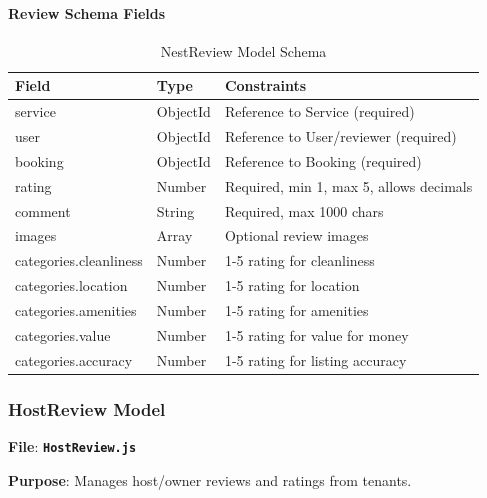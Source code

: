 \documentclass[12pt,a4paper]{article}
\newcommand{\file}[1]{\textbf{\texttt{#1}}}
\begin{document}
\paragraph{Review Schema Fields}
\begin{table}[H]
\centering
\small
\begin{tabular}{@{}lll@{}}
\toprule
\textbf{Field} & \textbf{Type} & \textbf{Constraints} \\
\midrule
service & ObjectId & Reference to Service (required) \\
user & ObjectId & Reference to User/reviewer (required) \\
booking & ObjectId & Reference to Booking (required) \\
rating & Number & Required, min 1, max 5, allows decimals \\
comment & String & Required, max 1000 chars \\
images & Array & Optional review images \\
categories.cleanliness & Number & 1-5 rating for cleanliness \\
categories.location & Number & 1-5 rating for location \\
categories.amenities & Number & 1-5 rating for amenities \\
categories.value & Number & 1-5 rating for value for money \\
categories.accuracy & Number & 1-5 rating for listing accuracy \\
\bottomrule
\end{tabular}
\caption{NestReview Model Schema}
\label{tab:nestreview-schema}
\end{table}

\subsubsection{HostReview Model}
\label{subsubsec:hostreview-model}

\textbf{File}: \file{HostReview.js}

\textbf{Purpose}: Manages host/owner reviews and ratings from tenants.
\end{document}
